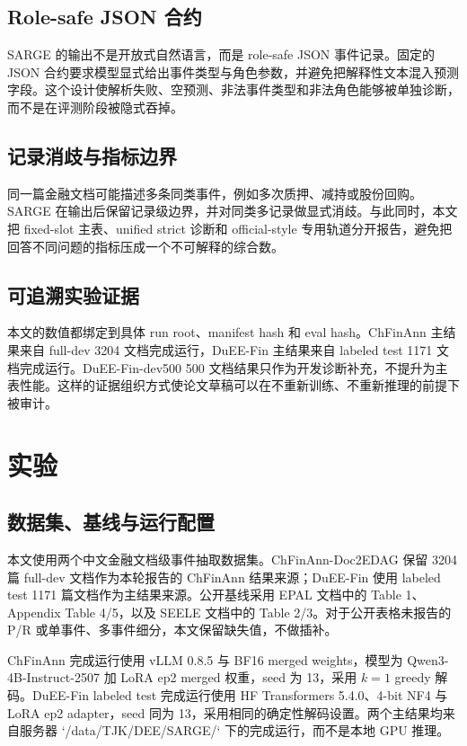 \documentclass[UTF8,fontset=none,11pt]{ctexart}
\begin{document}
\subsection{Role-safe JSON 合约}

SARGE 的输出不是开放式自然语言，而是 role-safe JSON 事件记录。固定的 JSON 合约要求模型显式给出事件类型与角色参数，并避免把解释性文本混入预测字段。这个设计使解析失败、空预测、非法事件类型和非法角色能够被单独诊断，而不是在评测阶段被隐式吞掉。

\subsection{记录消歧与指标边界}

同一篇金融文档可能描述多条同类事件，例如多次质押、减持或股份回购。SARGE 在输出后保留记录级边界，并对同类多记录做显式消歧。与此同时，本文把 fixed-slot 主表、unified strict 诊断和 official-style 专用轨道分开报告，避免把回答不同问题的指标压成一个不可解释的综合数。

\subsection{可追溯实验证据}

本文的数值都绑定到具体 run root、manifest hash 和 eval hash。ChFinAnn 主结果来自 full-dev 3204 文档完成运行，DuEE-Fin 主结果来自 labeled test 1171 文档完成运行。DuEE-Fin-dev500 500 文档结果只作为开发诊断补充，不提升为主表性能。这样的证据组织方式使论文草稿可以在不重新训练、不重新推理的前提下被审计。

\section{实验}

\subsection{数据集、基线与运行配置}

本文使用两个中文金融文档级事件抽取数据集。ChFinAnn-Doc2EDAG 保留 3204 篇 full-dev 文档作为本轮报告的 ChFinAnn 结果来源；DuEE-Fin 使用 labeled test 1171 篇文档作为主结果来源。公开基线采用 EPAL 文档中的 Table 1、Appendix Table 4/5，以及 SEELE 文档中的 Table 2/3。对于公开表格未报告的 P/R 或单事件、多事件细分，本文保留缺失值，不做插补。



ChFinAnn 完成运行使用 vLLM 0.8.5 与 BF16 merged weights，模型为 Qwen3-4B-Instruct-2507 加 LoRA ep2 merged 权重，seed 为 13，采用 $k=1$ greedy 解码。DuEE-Fin labeled test 完成运行使用 HF Transformers 5.4.0、4-bit NF4 与 LoRA ep2 adapter，seed 同为 13，采用相同的确定性解码设置。两个主结果均来自服务器 `/data/TJK/DEE/SARGE/` 下的完成运行，而不是本地 GPU 推理。
\end{document}
